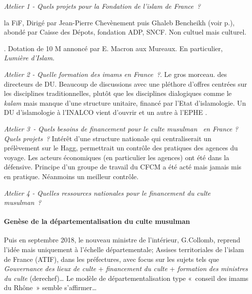  \bi 
    \item \textit{Atelier 1 - Quels projets pour la Fondation de l’islam de France ?}\begin{Def}
la FiF, Dirigé par Jean-Pierre Chevènement puis Ghaleb Bencheikh (voir p.\pageref{Theol:Bencheikh}), abondé par Caisse des Dépots, fondation ADP, SNCF. Non cultuel mais culturel.
\end{Def}
.
Dotation de 10 M\EUR{} annoncé par E. Macron aux Mureaux. En particulier, \textit{Lumière d'Islam}.
    \item \textit{Atelier 2 - Quelle formation des imams en France ?}. Le gros morceau. des directeurs de DU. Beaucoup de discussions avec une pléthore d'offres centrées sur les disciplines traditionnelles, plutôt que les disciplines dialogiques comme le \textit{kalam}  mais manque d'une structure unitaire, financé par l'Etat d'islamologie. Un DU d'islamologie à l'INALCO vient d'ouvrir  et un autre à l'EPHE .
    \item \textit{Atelier 3 - Quels besoins de financement pour le culte musulman  en France ? Quels projets ?} Intérêt d'une structure nationale qui centraliserait un prélèvement sur le Hagg, permettrait un contrôle des pratiques des agences du voyage.  Les acteurs économiques (en particulier les agences) ont été dans la défensive. Principe d'un groupe de travail du CFCM a été acté mais jamais mis en pratique. Néanmoins un meilleur contrôle. 
    \item \textit{Atelier 4 - Quelles ressources nationales pour le financement du culte musulman ?}
\ei 



\paragraph{Genèse de la départementalisation du culte musulman}
Puis en septembre 2018, le nouveau ministre de l’intérieur, G.Collomb, reprend l’idée mais uniquement à l’échelle départementale; Assises territoriales de l’islam de France (ATIF), dans les préfectures, avec focus sur les sujets tels que \textit{Gouvernance des lieux de culte} + \textit{financement du culte} + \textit{formation des ministres du culte} (derechef)… Le modèle de départementalisation type « conseil des imams du Rhône » semble s’affirmer…

